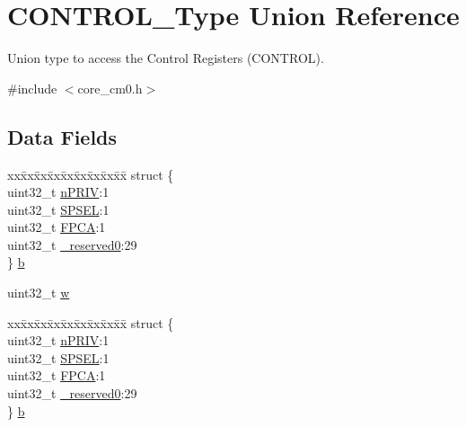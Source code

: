 \hypertarget{union_c_o_n_t_r_o_l___type}{\section{C\-O\-N\-T\-R\-O\-L\-\_\-\-Type Union Reference}
\label{union_c_o_n_t_r_o_l___type}
}


Union type to access the Control Registers (C\-O\-N\-T\-R\-O\-L).  




{\ttfamily \#include $<$core\-\_\-cm0.\-h$>$}

\subsection*{Data Fields}
\begin{DoxyCompactItemize}
\item 
\begin{tabbing}
xx\=xx\=xx\=xx\=xx\=xx\=xx\=xx\=xx\=\kill
struct \{\\
\>uint32\_t \hyperlink{union_c_o_n_t_r_o_l___type_a2a6e513e8a6bf4e58db169e312172332}{nPRIV}:1\\
\>uint32\_t \hyperlink{union_c_o_n_t_r_o_l___type_ae185aac93686ffc78e998a9daf41415b}{SPSEL}:1\\
\>uint32\_t \hyperlink{union_c_o_n_t_r_o_l___type_a2518558c090f60161ba4e718a54ee468}{FPCA}:1\\
\>uint32\_t \hyperlink{union_c_o_n_t_r_o_l___type_ac8a6a13838a897c8d0b8bc991bbaf7c1}{\_reserved0}:29\\
\} \hyperlink{union_c_o_n_t_r_o_l___type_ab2a41711c248a319c2e7d0ab73c3a8b9}{b}\\

\end{tabbing}\item 
uint32\-\_\-t \hyperlink{union_c_o_n_t_r_o_l___type_ad0fb62e7a08e70fc5e0a76b67809f84b}{w}
\item 
\begin{tabbing}
xx\=xx\=xx\=xx\=xx\=xx\=xx\=xx\=xx\=\kill
struct \{\\
\>uint32\_t \hyperlink{union_c_o_n_t_r_o_l___type_a2a6e513e8a6bf4e58db169e312172332}{nPRIV}:1\\
\>uint32\_t \hyperlink{union_c_o_n_t_r_o_l___type_ae185aac93686ffc78e998a9daf41415b}{SPSEL}:1\\
\>uint32\_t \hyperlink{union_c_o_n_t_r_o_l___type_a2518558c090f60161ba4e718a54ee468}{FPCA}:1\\
\>uint32\_t \hyperlink{union_c_o_n_t_r_o_l___type_ac8a6a13838a897c8d0b8bc991bbaf7c1}{\_reserved0}:29\\
\} \hyperlink{union_c_o_n_t_r_o_l___type_a362f58ce033c684dddd5ae69c5417ef5}{b}\\


\end{tabbing}
\end{DoxyCompactItemize}
